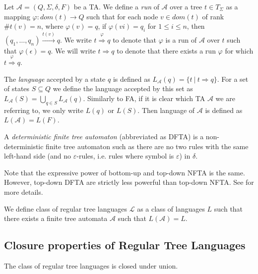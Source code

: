 Let $\mathcal{A} = (Q, \Sigma, \delta, F)$ be a TA. We define a \emph{run} of $\mathcal{A}$ over a tree $t \in T_\Sigma$ as a mapping $\varphi: dom(t) \to Q$ such that for each node $v \in dom(t)$ of rank $\#t(v) = n$, where $\varphi(v) = q$, if $\varphi(vi) = q_i$ for $1 \leq i \leq n$, then $(q_1,\ldots,q_n) \overset{t(v)}{\longrightarrow} q$. We write $t \overset{\varphi}{\Longrightarrow} q$ to denote that $\varphi$ is a run of $\mathcal{A}$ over $t$ such that $\varphi(\epsilon) = q$. We will write $t \Longrightarrow q$ to denote that there exists a run $\varphi$ for which $t \overset{\varphi}{\Longrightarrow} q$.

The \emph{language} accepted by a state $q$ is defined as $L_{\mathcal{A}}(q) = \{t\ |\ t \Rightarrow q\}$. For a set of states $S \subseteq Q$ we define the language accepted by this set as $L_{\mathcal{A}}(S) = \bigcup_{q \in S} L_{\mathcal{A}}(q)$. Similarly to FA, if it is clear which TA $\mathcal{A}$ we are referring to, we only write $L(q)$ or $L(S)$. Then language of $\mathcal{A}$ is defined as $L(\mathcal{A}) = L(F)$.

\begin{defz}
A \emph{deterministic finite tree automaton} (abbreviated as DFTA) is a non-deterministic finite tree automaton such as there are no two rules with the same left-hand side (and no $\varepsilon$-rules, i.e. rules where symbol is $\varepsilon$) in $\delta$.
\end{defz}

Note that the expressive power of bottom-up and top-down NFTA is the same. However, top-down DFTA are strictly less powerful than top-down NFTA. See \cite{tata} for more details.

\begin{defz}
We define class of regular tree languages $\mathcal{L}$ as a class of languages $L$ such that there exists a finite tree automata $\mathcal{A}$ such that $L(\mathcal{A}) = L$.
\end{defz}



\subsection{Closure properties of Regular Tree Languages}

\begin{theorem}
 The class of regular tree languages is closed under union.
\end{theorem}

